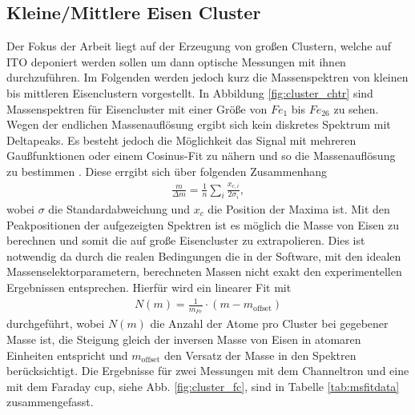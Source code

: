 \subsection{Kleine/Mittlere Eisen Cluster}
Der Fokus der Arbeit liegt auf der Erzeugung von großen Clustern, welche auf ITO deponiert werden sollen um dann optische Messungen mit ihnen durchzuführen.
Im Folgenden werden jedoch kurz die Massenspektren von kleinen bis mittleren Eisenclustern vorgestellt.
In Abbildung \ref{fig:cluster_chtr} sind Massenspektren für Eisencluster mit einer Größe von $Fe_{1}$ bis $Fe_{26}$ zu sehen.
Wegen der endlichen Massenauflösung ergibt sich kein diskretes Spektrum mit Deltapeaks.
Es besteht jedoch die Möglichkeit das Signal mit mehreren Gaußfunktionen oder einem Cosinus-Fit zu nähern und so die Massenauflösung zu bestimmen \cite[S. 94 ff.]{krause}.
Diese errgibt sich über folgenden Zusammenhang
\begin{align}
  \frac{m}{\Delta m} = \frac{1}{n} \sum\limits_{i} \frac{x_{c,i}}{2 \sigma_i},
\end{align}
wobei $\sigma$ die Standardabweichung und $x_c$ die Position der Maxima ist.
Mit den Peakpositionen der aufgezeigten Spektren ist es möglich die Masse von Eisen zu berechnen und somit die auf große Eisencluster zu extrapolieren.
Dies ist notwendig da durch die realen Bedingungen die in der Software, mit den idealen Massenselektorparametern, berechneten Massen nicht exakt den experimentellen Ergebnissen entsprechen.
Hierfür wird ein linearer Fit mit
\begin{align}
  N\left(m\right) = \frac{1}{m_{Fe}} \cdot \left(m-m_{\text{offset}}\right)
\end{align}
durchgeführt, wobei $N\left(m\right)$ die Anzahl der Atome pro Cluster bei gegebener Masse ist, die Steigung gleich der inversen Masse von Eisen in atomaren Einheiten entspricht und $m_{\text{offset}}$ den Versatz der Masse in den Spektren berücksichtigt.
Die Ergebnisse für zwei Messungen mit dem Channeltron und eine mit dem Faraday cup, siehe Abb. \ref{fig:cluster_fc}, sind in Tabelle \ref{tab:msfitdata} zusammengefasst.

